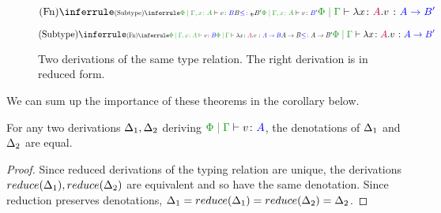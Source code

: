 \documentclass{Report}
\begin{document}
\begin{figure}[h!]
    \begin{framed}
        \begin{minipage}{0.47\textwidth}
            \begin{equation}
                \ntreeruleI{\vfun}{\scalebox{.65}{$
                    \ntreeruleII{\vsubtype}{
                        \etyperelation{\P}{\gax}{v}{B}
                    }{
                        B \subtypep B'
                    }{
                        \etyperelation{\P}{\gax}{v}{B'}
                    }
                $}}{\gpetyperelation{\lam{x}{A}{v}}{\fntype{A}{B'}}}
            \end{equation}
        \end{minipage}
        \quad
        \begin{minipage}{0.47\textwidth}
            \begin{equation}
                \ntreeruleII{\vsubtype}{
                    \scalebox{.65}{$
                    \ntreeruleI{\vfun}{
                        \etyperelation{\P}{\gax}{v}{B} 
                    }{    
                        \gpetyperelation{\lam{x}{A}{v}}{\fntype{A}{B}}
                    }
                    $}
                }{ 
                    \scalebox{.7}{$\ab \subtype \fntype{A}{B'}$}
                }{
                    \gpetyperelation{\lam{x}{A}{v}}{\fntype{A}{B'}}
                }
            \end{equation}
        \end{minipage}
        
    \end{framed}

    \caption{Two derivations of the same type relation. The right derivation is in reduced form.}
\end{figure}

We can sum up the importance of these theorems in the corollary below.

\begin{framed}
    \begin{corollary}\label{DenotationsAreUnique}
      For any two derivations $\Delta_1, \Delta_2$ deriving $\gpetyperelation{v}{A}$, the denotations of $\Delta_1$ and $\Delta_2$ are equal.
    \end{corollary}

    \begin{proof}
        Since reduced derivations of the typing relation are unique, the derivations $reduce(\Delta_1), reduce(\Delta_2)$ are equivalent and so have the same denotation. Since reduction preserves denotations, $\Delta_1 = reduce(\Delta_1) = reduce(\Delta_2) = \Delta_2$.
    \end{proof}
\end{framed}
\end{document}
